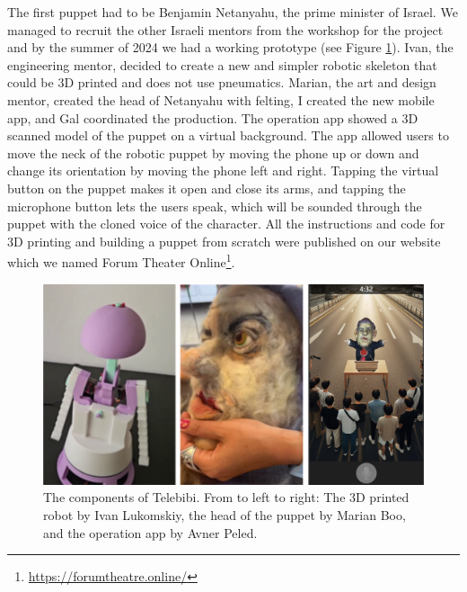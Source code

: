 \documentclass[dissertation,math,vertlayout,pdfa,colorlinks]{aaltoseries}
\begin{document}
The first puppet had to be Benjamin Netanyahu, the prime minister of Israel. We managed to recruit the other Israeli mentors from the workshop for the project and by the summer of 2024 we had a working prototype (see Figure \ref{fig:telebibi-making}). Ivan, the engineering mentor, decided to create a new and simpler robotic skeleton that could be 3D printed and does not use pneumatics. Marian, the art and design mentor, created the head of Netanyahu with felting, I created the new mobile app, and Gal coordinated the production. The operation app showed a 3D scanned model of the puppet on a virtual background. The app allowed users to move the neck of the robotic puppet by moving the phone up or down and change its orientation by moving the phone left and right. Tapping the virtual button on the puppet makes it open and close its arms, and tapping the microphone button lets the users speak, which will be sounded through the puppet with the cloned voice of the character. All the instructions and code for 3D printing and building a puppet from scratch were published on our website which we named Forum Theater Online\footnote{\url{https://forumtheatre.online/}}.

\begin{figure}
    \includegraphics[width=1\linewidth]{telebibi-making.png}
    \caption{The components of Telebibi. From to left to right: The 3D printed robot by Ivan Lukomskiy, the head of the puppet by Marian Boo, and the operation app by Avner Peled.}
    \label{fig:telebibi-making}
\end{figure}
\end{document}
